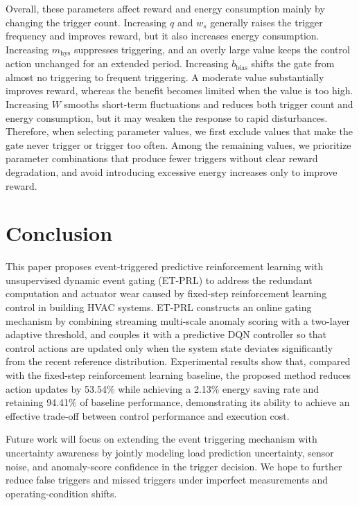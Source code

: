 ﻿\documentclass[preprint,12pt,number]{elsarticle}
\begin{document}
Overall, these parameters affect reward and energy consumption mainly by changing the trigger count. Increasing \(q\) and \(w_s\) generally raises the trigger frequency and improves reward, but it also increases energy consumption. Increasing \(m_{\mathrm{hys}}\) suppresses triggering, and an overly large value keeps the control action unchanged for an extended period. Increasing \(b_{\mathrm{bias}}\) shifts the gate from almost no triggering to frequent triggering. A moderate value substantially improves reward, whereas the benefit becomes limited when the value is too high. Increasing \(W\) smooths short-term fluctuations and reduces both trigger count and energy consumption, but it may weaken the response to rapid disturbances. Therefore, when selecting parameter values, we first exclude values that make the gate never trigger or trigger too often. Among the remaining values, we prioritize parameter combinations that produce fewer triggers without clear reward degradation, and avoid introducing excessive energy increases only to improve reward.

\section{Conclusion}\label{conclusion}

This paper proposes event-triggered predictive reinforcement learning with unsupervised dynamic event gating (ET-PRL) to address the redundant computation and actuator wear caused by fixed-step reinforcement learning control in building HVAC systems. ET-PRL constructs an online gating mechanism by combining streaming multi-scale anomaly scoring with a two-layer adaptive threshold, and couples it with a predictive DQN controller so that control actions are updated only when the system state deviates significantly from the recent reference distribution. Experimental results show that, compared with the fixed-step reinforcement learning baseline, the proposed method reduces action updates by 53.54\% while achieving a 2.13\% energy saving rate and retaining 94.41\% of baseline performance, demonstrating its ability to achieve an effective trade-off between control performance and execution cost.

Future work will focus on extending the event triggering mechanism with uncertainty awareness by jointly modeling load prediction uncertainty, sensor noise, and anomaly-score confidence in the trigger decision. We hope to further reduce false triggers and missed triggers under imperfect measurements and operating-condition shifts.
\end{document}
